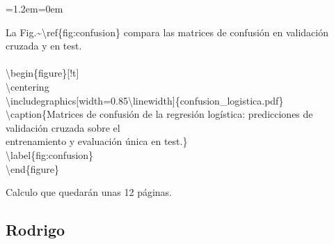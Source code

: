 \documentclass[11pt,a4paper]{article}
\newenvironment{codigo}
  {\par\smallskip\begin{list}{}{\leftmargin=1.2em\rightmargin=0em}\item\relax\ttfamily\scriptsize\raggedright}
  {\end{list}\smallskip}
\begin{document}
{\begin{codigo}
La Fig.\textasciitilde{}\textbackslash\allowbreak{}ref\{fig:confusion\} compara las matrices de confusión en validación cruzada y en test. \\{}
\mbox{} \\{}
\textbackslash\allowbreak{}begin\{figure\}[!t] \\{}
\textbackslash\allowbreak{}centering \\{}
\textbackslash\allowbreak{}includegraphics[width=0.85\textbackslash\allowbreak{}linewidth]\{confusion\_\allowbreak{}logistica.pdf\} \\{}
\textbackslash\allowbreak{}caption\{Matrices de confusión de la regresión logística: predicciones de validación cruzada sobre el \\{}
entrenamiento y evaluación única en test.\} \\{}
\textbackslash\allowbreak{}label\{fig:confusion\} \\{}
\textbackslash\allowbreak{}end\{figure\}
\end{codigo}
Calculo que quedarán unas 12 páginas.

}


\subsection*{Rodrigo}
\end{document}
